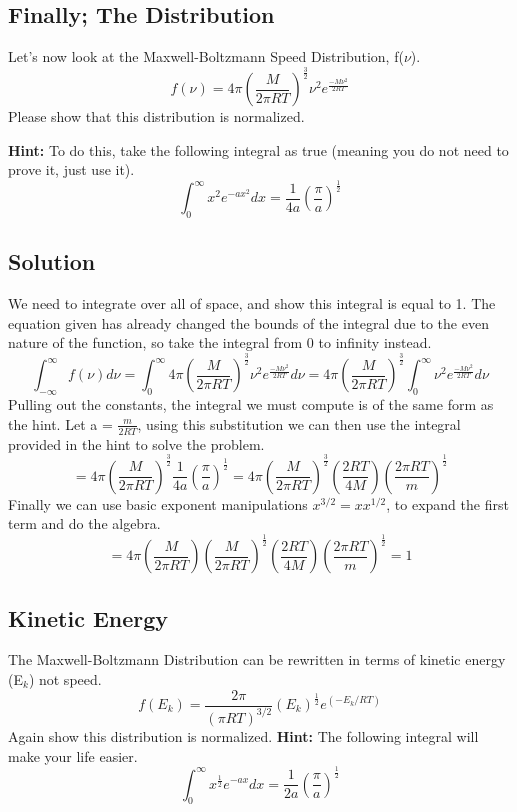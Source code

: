 \documentclass{article}
\newcommand{\be}{\begin{equation}}
\newcommand{\ee}{\end{equation}}
\begin{document}
\subsection{Finally; The Distribution}
Let's now look at the Maxwell-Boltzmann Speed Distribution, f($\nu$).
\be
f(\nu) = 4\pi \left(\frac{M}{2\pi RT}\right)^{\frac{3}{2}} \nu^2 e^{\frac{-M\nu^2}{2RT}}
\ee
Please show that this distribution is normalized. 

\textbf{Hint:} To do this, take the following integral as true (meaning you do not need to prove it, just use it). 
\be
\int_0^\infty x^2 e^{-ax^2} dx = \frac{1}{4a}\left(\frac{\pi}{a}\right)^{\frac{1}{2}}
\ee

\subsection*{Solution}
We need to integrate over all of space, and show this integral is equal to 1. 
The equation given has already changed the bounds of the integral due to the even nature of the function, so take the integral from 0 to infinity instead. 
\be
\int_{-\infty}^\infty f(\nu)d\nu = \int_0^\infty 4\pi \left(\frac{M}{2\pi RT}\right)^{\frac{3}{2}} \nu^2 e^{\frac{-M\nu^2}{2RT}}d\nu = 4\pi \left(\frac{M}{2\pi RT}\right)^{\frac{3}{2}} \int_0^\infty \nu^2 e^{\frac{-M\nu^2}{2RT}}d\nu
\ee
Pulling out the constants, the integral we must compute is of the same form as the hint. 
Let a = $\frac{m}{2RT}$, using this substitution we can then use the integral provided in the hint to solve the problem.
\be
= 4\pi \left(\frac{M}{2\pi RT}\right)^{\frac{3}{2}} \frac{1}{4a}\left(\frac{\pi}{a}\right)^{\frac{1}{2}} = 4\pi \left(\frac{M}{2\pi RT}\right)^{\frac{3}{2}}\left(\frac{2RT}{4M}\right)\left(\frac{2\pi RT}{m}\right)^{\frac{1}{2}}
\ee
Finally we can use basic exponent manipulations $x^{3/2} = x x^{1/2}$, to expand the first term and do the algebra. 
\be
= 4\pi \left(\frac{M}{2\pi RT}\right) \left(\frac{M}{2\pi RT}\right)^{\frac{1}{2}}\left(\frac{2RT}{4M}\right)\left(\frac{2\pi RT}{m}\right)^{\frac{1}{2}} = 1
\ee

\subsection{Kinetic Energy}
The Maxwell-Boltzmann Distribution can be rewritten in terms of kinetic energy (E$_k$) not speed. 
\be
f(E_k) = \frac{2\pi}{(\pi RT)^{3/2}} \left(E_k\right)^{\frac{1}{2}} e^{\left(-E_k/RT\right)} 
\ee
Again show this distribution is normalized.
\textbf{Hint:} The following integral will make your life easier. 
\be
\int_0^\infty x^{\frac{1}{2}} e^{-ax} dx = \frac{1}{2a}\left(\frac{\pi}{a}\right)^{\frac{1}{2}}
\ee
\end{document}
